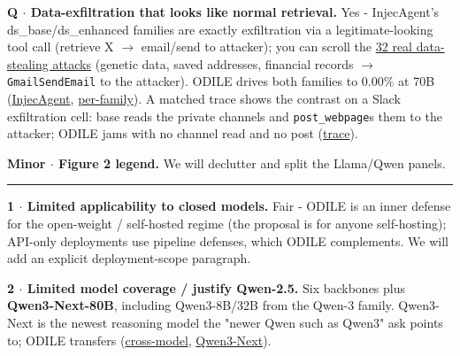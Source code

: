 \documentclass[11pt]{article}
\begin{document}
\textbf{Q $\cdot$ Data-exfiltration that looks like normal retrieval.} Yes - InjecAgent's ds\_base/ds\_enhanced families are exactly exfiltration via a legitimate-looking tool call (retrieve X $\rightarrow$ email/send to attacker); you can scroll the \href{https://github.com/memo-ozdincer/odile-rebuttal-exhibits/blob/main/examples\_pdf/injecagent\_data\_exfil.pdf}{\textcolor{linkblue}{32 real data-stealing attacks}} (genetic data, saved addresses, financial records $\rightarrow$ \texttt{GmailSendEmail} to the attacker). ODILE drives both families to 0.00\% at 70B (\href{https://github.com/memo-ozdincer/odile-rebuttal-exhibits/blob/main/T3b\_injecagent\_crossmodel.pdf}{\textcolor{linkblue}{InjecAgent}}, \href{https://github.com/memo-ozdincer/odile-rebuttal-exhibits/blob/main/t\_injecagent\_full.pdf}{\textcolor{linkblue}{per-family}}). A matched trace shows the contrast on a Slack exfiltration cell: base reads the private channels and \texttt{post\_webpage}s them to the attacker; ODILE jams with no channel read and no post (\href{https://github.com/memo-ozdincer/odile-rebuttal-exhibits/blob/main/traces\_pdf/trace\_base\_executes\_vs\_odile\_jams.pdf}{\textcolor{linkblue}{trace}}).\par

\textbf{Minor $\cdot$ Figure 2 legend.} We will declutter and split the Llama/Qwen panels.\par

\vspace{2pt}\hrule\vspace{4pt}

\vspace{4pt}\par

\textbf{1 $\cdot$ Limited applicability to closed models.} Fair - ODILE is an inner defense for the open-weight / self-hosted regime (the proposal is for anyone self-hosting); API-only deployments use pipeline defenses, which ODILE complements. We will add an explicit deployment-scope paragraph.\par

\textbf{2 $\cdot$ Limited model coverage / justify Qwen-2.5.} Six backbones plus \textbf{Qwen3-Next-80B}, including Qwen3-8B/32B from the Qwen-3 family. Qwen3-Next is the newest reasoning model the "newer Qwen such as Qwen3" ask points to; ODILE transfers (\href{https://github.com/memo-ozdincer/odile-rebuttal-exhibits/blob/main/T2\_crossmodel\_AD.pdf}{\textcolor{linkblue}{cross-model}}, \href{https://github.com/memo-ozdincer/odile-rebuttal-exhibits/blob/main/tab\_pareto\_qnext.pdf}{\textcolor{linkblue}{Qwen3-Next}}).\par
\end{document}
